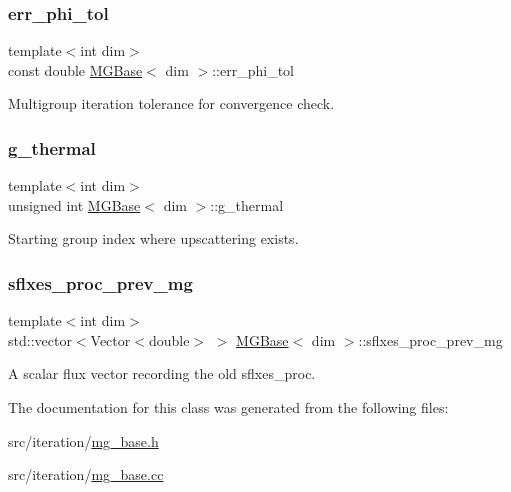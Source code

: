 \subsubsection{\texorpdfstring{err\+\_\+phi\+\_\+tol}{err\_phi\_tol}}
{\footnotesize\ttfamily template$<$int dim$>$ \\
const double \hyperlink{class_m_g_base}{M\+G\+Base}$<$ dim $>$\+::err\+\_\+phi\+\_\+tol\hspace{0.3cm}{\ttfamily [protected]}}



Multigroup iteration tolerance for convergence check. 

\mbox{\label{class_m_g_base_a7df1f6ce51cf6eb033420be98b1f0019}} 
\subsubsection{\texorpdfstring{g\+\_\+thermal}{g\_thermal}}
{\footnotesize\ttfamily template$<$int dim$>$ \\
unsigned int \hyperlink{class_m_g_base}{M\+G\+Base}$<$ dim $>$\+::g\+\_\+thermal\hspace{0.3cm}{\ttfamily [protected]}}



Starting group index where upscattering exists. 

\mbox{\label{class_m_g_base_ad8a9d4163bb31470fff74fe787c23788}} 
\subsubsection{\texorpdfstring{sflxes\+\_\+proc\+\_\+prev\+\_\+mg}{sflxes\_proc\_prev\_mg}}
{\footnotesize\ttfamily template$<$int dim$>$ \\
std\+::vector$<$Vector$<$double$>$ $>$ \hyperlink{class_m_g_base}{M\+G\+Base}$<$ dim $>$\+::sflxes\+\_\+proc\+\_\+prev\+\_\+mg\hspace{0.3cm}{\ttfamily [protected]}}



A scalar flux vector recording the old sflxes\+\_\+proc. 



The documentation for this class was generated from the following files\+:\begin{DoxyCompactItemize}
\item 
src/iteration/\hyperlink{mg__base_8h}{mg\+\_\+base.\+h}\item 
src/iteration/\hyperlink{mg__base_8cc}{mg\+\_\+base.\+cc}\end{DoxyCompactItemize}
